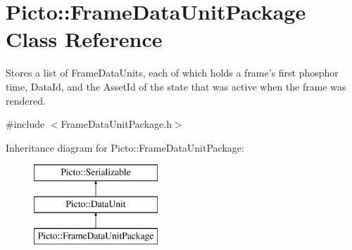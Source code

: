 \hypertarget{class_picto_1_1_frame_data_unit_package}{\section{Picto\-:\-:Frame\-Data\-Unit\-Package Class Reference}
\label{class_picto_1_1_frame_data_unit_package}
}


Stores a list of Frame\-Data\-Units, each of which holds a frame's first phosphor time, Data\-Id, and the Asset\-Id of the state that was active when the frame was rendered.  




{\ttfamily \#include $<$Frame\-Data\-Unit\-Package.\-h$>$}

Inheritance diagram for Picto\-:\-:Frame\-Data\-Unit\-Package\-:\begin{figure}[H]
\begin{center}
\leavevmode
\includegraphics[height=3.000000cm]{class_picto_1_1_frame_data_unit_package}
\end{center}
\end{figure}
